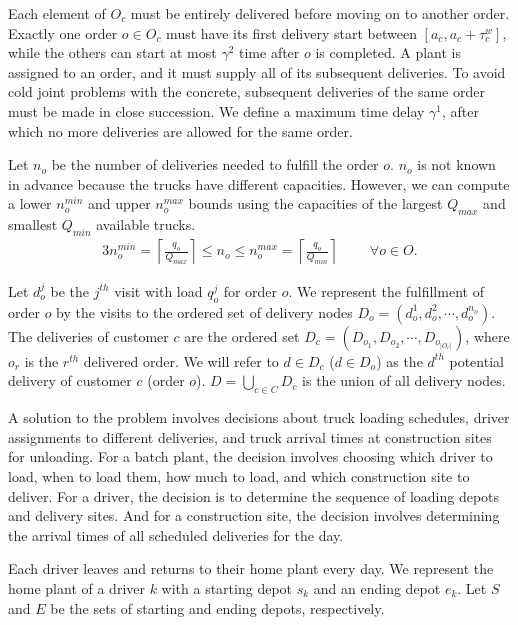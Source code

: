 \documentclass{article}
\begin{document}
Each element of $O_c$ must be entirely delivered before moving on to another order. Exactly one order $o \in O_c$ must have its first delivery start between $\left[a_c, a_c + \tau^w_c \right]$, while the others can start at most $\gamma^2$ time after $o$ is completed. A plant is assigned to an order, and it must supply all of its subsequent deliveries. To avoid cold joint problems with the concrete, subsequent deliveries of the same order must be made in close succession. We define a maximum time delay $\gamma^1$, after which no more deliveries are allowed for the same order.

Let $n_o$ be the number of deliveries needed to fulfill the order $o$. $n_o$ is not known in advance because the trucks have different capacities. However, we can compute a lower $n_o^{min}$ and upper $n_o^{max}$ bounds using the capacities of the largest $Q_{max}$ and smallest $Q_{min}$ available trucks.
\begin{alignat}{3}
    \label{mod:c0}
    n_o^{min} = \left\lceil \frac{q_o}{Q_{max}} \right\rceil \leq n_o \leq n_o^{max} = \left\lceil \frac{q_o}{Q_{min}} \right\rceil & \text{ } &
    \forall  o \in O.
\end{alignat}

Let $d^j_{o}$ be the $j^{th}$ visit with load $q^j_{o}$ for order $o$. We represent the fulfillment of order $o$ by the visits to the ordered set of delivery nodes $D_o= \left(d^1_{o},d^2_{o},\cdots, d^{n_o}_{o}\right)$. The deliveries of customer $c$ are the ordered set $D_c= (D_{o_1}, D_{o_2},\cdots,D_{o_{|O_c|}})$, where $o_r$ is the $r^{th}$ delivered order. We will refer to $d \in D_c$ ($d \in D_o$) as the $d^{th}$ potential delivery of customer $c$ (order $o$). $D=\bigcup_{c\in C} D_c$ is the union of all delivery nodes.

A solution to the problem involves decisions about truck loading schedules, driver assignments to different deliveries, and truck arrival times at construction sites for unloading. For a batch plant, the decision involves choosing which driver to load, when to load them, how much to load, and which construction site to deliver. For a driver, the decision is to determine the sequence of loading depots and delivery sites. And for a construction site, the decision involves determining the arrival times of all scheduled deliveries for the day.

Each driver leaves and returns to their home plant every day. We represent the home plant of a driver $k$ with a starting depot $s_k$ and an ending depot $e_k$. Let $S$ and $E$ be the sets of starting and ending depots, respectively.
\end{document}
